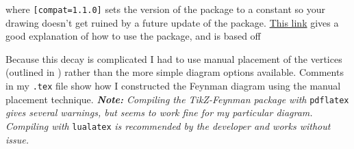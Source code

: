 \documentclass[12pt, letterpaper]{article}
\begin{document}
where {\tt [compat=1.1.0]} sets the version of the package to a constant so your drawing doesn't get ruined by a future update of the package. \href{https://www.overleaf.com/learn/latex/feynman\_diagrams}{This link} gives a good explanation of how to use the package, and is based off \citet[]{Ellis2016}

Because this decay is complicated I had to use manual placement of the vertices (outlined in \citet[Sec 2.4.3]{Ellis2016}) rather than the more simple diagram options available. Comments in my \texttt{.tex} file show how I constructed the Feynman diagram using the manual placement technique.
\vspace{4mm}
\noindent \emph{\textbf{Note:} Compiling the TikZ-Feynman package with} \texttt{pdflatex} \emph{gives several warnings, but seems to work fine for my particular diagram. Compiling with} \texttt{lualatex} \emph{is recommended by the developer and works without issue.}



\clearpage




\end{document}
